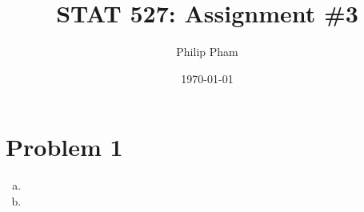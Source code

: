 \documentclass[letterpaper]{article}
\title{STAT 527: Assignment \#3}
\author{Philip Pham}
\date{\today}
\begin{document}
\maketitle

\section*{Problem 1}

\begin{enumerate}[(a)]
\item 
\item 
\end{enumerate}
\end{document}
